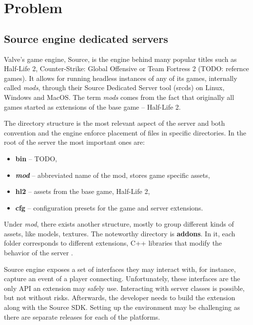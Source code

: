 \chapter{Problem}

\section{Source engine dedicated servers}

Valve's game engine, Source, is the engine behind many popular titles such as Half-Life 2, Counter-Strike: Global Offensive or Team Fortress 2 (TODO: refernce games).
It allows for running headless instances of any of its games, internally called \textit{mods}, through their Source Dedicated Server tool (srcds) on Linux, Windows and MacOS.
The term \textit{mods} comes from the fact that originally all games started as extensions of the base game -- Half-Life 2.

The directory structure is the most relevant aspect of the server and both convention and the engine enforce placement of files in specific directories.
In the root of the server the most important ones are:
\begin{itemize}
    \item \textbf{bin} -- TODO,
    \item \textbf{\textit{mod}} -- abbreviated name of the mod, stores game specific assets,
    \item \textbf{hl2} -- assets from the base game, Half-Life 2,
    \item \textbf{cfg} -- configuration presets for the game and server extensions.
\end{itemize}
Under \textit{mod}, there exists another structure, mostly to group different kinds of assets, like models, textures.
The noteworthy directory is \textbf{addons}.
In it, each folder corresponds to different extensions, C++ libraries that modify the behavior of the server \cite{server-plugins}.

Source engine exposes a set of interfaces they may interact with, for instance, capture an event of a player connecting.
Unfortunately, these interfaces are the only API an extension may safely use.
Interacting with server classes is possible, but not without risks.
Afterwards, the developer needs to build the extension along with the Source SDK.
Setting up the environment may be challenging as there are separate releases for each of the platforms.

